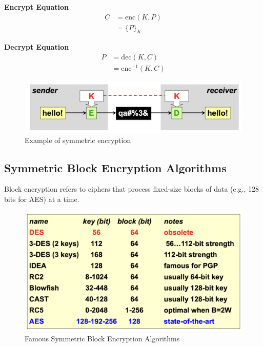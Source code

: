 \begin{multicols}{2}

    \textbf{Encrypt Equation}
\begin{equation*}
    \begin{aligned}
        C &= \text{enc}(K, P) \\
          &= \{ P \}_K
    \end{aligned}
\end{equation*}

\hfill

\textbf{Decrypt Equation}
\begin{equation*}
    \begin{aligned}
        P &= \text{dec}(K, C) \\
          &= \text{enc}^{-1}(K, C)
    \end{aligned}
\end{equation*}
    \columnbreak
    
    \begin{figure}[H]
        \centering
        \includegraphics[width=\linewidth]{Images/Cryptography/symmCrypto.png}
        \caption{Example of symmetric encryption}
    \end{figure}
\end{multicols}

\clearpage

\subsection{Symmetric Block Encryption Algorithms}
Block encryption refers to ciphers that process fixed-size blocks of data (e.g., 128 bits for AES) at a time.

\begin{figure}[H]
    \centering
    \includegraphics[width=0.5\linewidth]{Images/Cryptography/blockSymm.png}
    \caption{Famous Symmetric Block Encryption Algorithms}
\end{figure}


